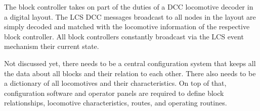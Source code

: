 The block controller takes on part of the duties of a DCC locomotive decoder in a digital layout. The LCS DCC messages broadcast to all nodes in the layout are simply decoded and matched with the locomotive information of the respective block controller. All block controllers constantly broadcast via the LCS event mechanism their current state.

Not discussed yet, there needs to be a central configuration system that keeps all the data about all blocks and their relation to each other. There also needs to be a dictionary of all locomotives and their characteristics. On top of that, configuration software and operator panels are required to define block relationships, locomotive characteristics, routes, and operating routines.